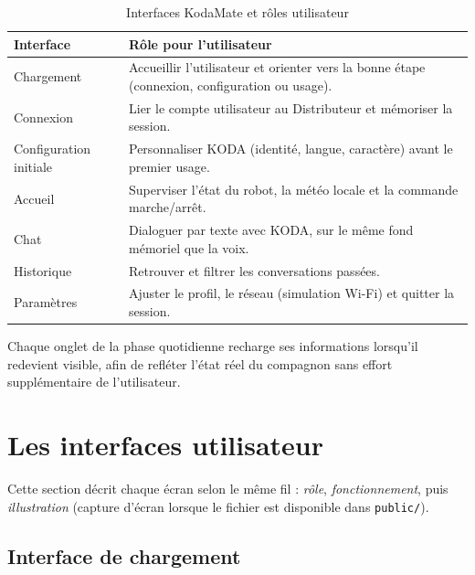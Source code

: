\documentclass[a4paper,12pt]{report}
\begin{document}
	\begin{table}[H]
		\centering
		\caption{Interfaces KodaMate et rôles utilisateur}
		\label{tab:ch5-perimetre}
		\renewcommand{\arraystretch}{1.25}
		\begin{tabularx}{\textwidth}{|>{\raggedright\arraybackslash}p{3.6cm}|>{\raggedright\arraybackslash}X|}
			\hline
			\textbf{Interface} & \textbf{Rôle pour l'utilisateur} \\
			\hline
			Chargement & Accueillir l'utilisateur et orienter vers la bonne étape (connexion, configuration ou usage). \\
			\hline
			Connexion & Lier le compte utilisateur au Distributeur et mémoriser la session. \\
			\hline
			Configuration initiale & Personnaliser KODA (identité, langue, caractère) avant le premier usage. \\
			\hline
			Accueil & Superviser l'état du robot, la météo locale et la commande marche/arrêt. \\
			\hline
			Chat & Dialoguer par texte avec KODA, sur le même fond mémoriel que la voix. \\
			\hline
			Historique & Retrouver et filtrer les conversations passées. \\
			\hline
			Paramètres & Ajuster le profil, le réseau (simulation Wi-Fi) et quitter la session. \\
			\hline
		\end{tabularx}
	\end{table}
	
	Chaque onglet de la phase quotidienne recharge ses informations lorsqu'il
	redevient visible, afin de refléter l'état réel du compagnon sans effort
	supplémentaire de l'utilisateur.
	
	\section{Les interfaces utilisateur}
	
	Cette section décrit chaque écran selon le même fil : \emph{rôle},
	\emph{fonctionnement}, puis \emph{illustration} (capture d'écran lorsque le
	fichier est disponible dans \texttt{public/}).
	
	\subsection{Interface de chargement}
	
\end{document}
